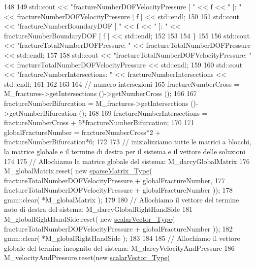 \begin{DoxyCode}
148         
149         std::cout << \textcolor{stringliteral}{"fractureNumberDOFVelocityPressure [ "} << f << \textcolor{stringliteral}{" ]:  "} << 
      fractureNumberDOFVelocityPressure [ f ] << std::endl;
150         
151         std::cout << \textcolor{stringliteral}{"fractureNumberBoundaryDOF [ "} << f << \textcolor{stringliteral}{" ]:  "} << fractureNumberBoundaryDOF [ f ] << 
      std::endl;
152         
153         
154     \}
155     
156     std::cout << \textcolor{stringliteral}{"fractureTotalNumberDOFPressure:  "} << fractureTotalNumberDOFPressure << std::endl;
157       
158     std::cout << \textcolor{stringliteral}{"fractureTotalNumberDOFVelocityPressure:  "} << fractureTotalNumberDOFVelocityPressure << 
      std::endl;
159 
160     std::cout << \textcolor{stringliteral}{"fractureNumberIntersections:  "} << fractureNumberIntersections << std::endl;
161     
162     
163 
164     \textcolor{comment}{// numero intersezioni}
165     fractureNumberCross = M\_fractures->getIntersections ()->getNumberCross ();
166    
167     fractureNumberBifurcation = M\_fractures->getIntersections ()->getNumberBifurcation ();
168     
169     fractureNumberIntersections = fractureNumberCross + 5*fractureNumberBifurcation;
170     
171     globalFractureNumber = fractureNumberCross*2 + fractureNumberBifurcation*6;
172         
173     \textcolor{comment}{// inizializziamo tutte le matrici a blocchi, la matrice globale e il termine di destra per il sistema
       e il vettore delle soluzioni }
174     
175     \textcolor{comment}{// Allochiamo la matrice globale del sistema:  M\_darcyGlobalMatrix}
176     M\_globalMatrix.reset( \textcolor{keyword}{new} \hyperlink{Core_8h_afba9f623673e2ae32054015bdb5500f9}{sparseMatrix\_Type}( fractureTotalNumberDOFVelocityPressure + 
      globalFractureNumber,
177                                                  fractureTotalNumberDOFVelocityPressure + 
      globalFractureNumber ));
178     gmm::clear( *M\_globalMatrix );
179     
180     \textcolor{comment}{// Allochiamo il vettore del termine noto di destra del sistema: M\_darcyGlobalRightHandSide}
181     M\_globalRightHandSide.reset( \textcolor{keyword}{new} \hyperlink{Core_8h_a4e75b5863535ba1dd79942de2846eff0}{scalarVector\_Type}( 
      fractureTotalNumberDOFVelocityPressure + globalFractureNumber ));
182     gmm::clear( *M\_globalRightHandSide );
183 
184     
185     \textcolor{comment}{// Allochiamo il vettore globale del termine incognito del sistema: M\_darcyVelocityAndPressure}
186     M\_velocityAndPressure.reset(\textcolor{keyword}{new} \hyperlink{Core_8h_a4e75b5863535ba1dd79942de2846eff0}{scalarVector\_Type}( 

\end{DoxyCode}
